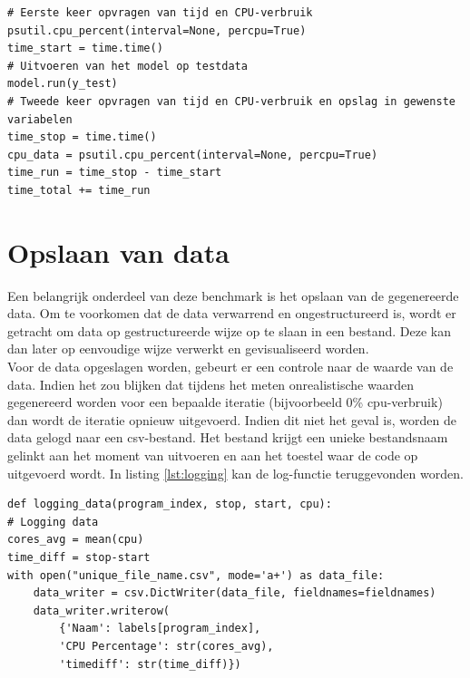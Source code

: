 	\begin{lstlisting}[caption={Meten van gewenste data.}, captionpos=b,label={lst:meting}]
# Eerste keer opvragen van tijd en CPU-verbruik
psutil.cpu_percent(interval=None, percpu=True)
time_start = time.time()
# Uitvoeren van het model op testdata
model.run(y_test)
# Tweede keer opvragen van tijd en CPU-verbruik en opslag in gewenste variabelen
time_stop = time.time()
cpu_data = psutil.cpu_percent(interval=None, percpu=True)
time_run = time_stop - time_start
time_total += time_run
\end{lstlisting}

\section{Opslaan van data}
	Een belangrijk onderdeel van deze benchmark is het opslaan van de gegenereerde data. Om te voorkomen dat de data verwarrend en ongestructureerd is, wordt er getracht om data op gestructureerde wijze op te slaan in een bestand. Deze kan dan later op eenvoudige wijze verwerkt en gevisualiseerd worden. \\
	Voor de data opgeslagen worden, gebeurt er een controle naar de waarde van de data. Indien het zou blijken dat tijdens het meten onrealistische waarden gegenereerd worden voor een bepaalde iteratie (bijvoorbeeld 0\% \gls{cpu}-verbruik) dan wordt de iteratie opnieuw uitgevoerd. Indien dit niet het geval is, worden de data gelogd naar een \gls{csv}-bestand. Het bestand krijgt een unieke bestandsnaam gelinkt aan het moment van uitvoeren en aan het toestel waar de code op uitgevoerd wordt. In listing \ref{lst:logging} kan de log-functie teruggevonden worden.
	
	
	\begin{lstlisting}[caption={Opslaan van de gewenste data.}, captionpos=b,label={lst:logging}]
def logging_data(program_index, stop, start, cpu):
# Logging data
cores_avg = mean(cpu)
time_diff = stop-start
with open("unique_file_name.csv", mode='a+') as data_file:
	data_writer = csv.DictWriter(data_file, fieldnames=fieldnames)
	data_writer.writerow(
		{'Naam': labels[program_index],
		'CPU Percentage': str(cores_avg),
		'timediff': str(time_diff)})
\end{lstlisting}	
	
	
	
	
	
	
	
	
	
	
	
	
	